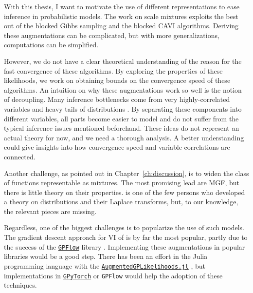 

\graphicspath{{9_conclusion/figures/}}
With this thesis, I want to motivate the use of different representations to ease inference in probabilistic models.
The work on scale mixtures exploits the best out of the blocked Gibbs sampling and the blocked \ac{CAVI} algorithms.
Deriving these augmentations can be complicated, but with more generalizations, computations can be simplified.

However, we do not have a clear theoretical understanding of the reason for the fast convergence of these algorithms.
By exploring the properties of these likelihoods, we work on obtaining bounds on the convergence speed of these algorithms.
An intuition on why these augmentations work so well is the notion of decoupling.
Many inference bottlenecks come from very highly-correlated variables and heavy tails of distributions \cite{betancourt2017conceptual}.
By separating these components into different variables, all parts become easier to model and do not suffer from the typical inference issues mentioned beforehand.
These ideas do not represent an actual theory for now, and we need a thorough analysis.
A better understanding could give insights into how convergence speed and variable correlations are connected.

Another challenge, as pointed out in Chapter~\ref{ch:discussion}, is to widen the class of functions representable as mixtures.
The most promising lead are \acf{MGF}, but there is little theory on their properties.
\citet{schwartz1952transformation} is one of the few persons who developed a theory on distributions and their Laplace transforms, but, to our knowledge, the relevant pieces are missing.

Regardless, one of the biggest challenges is to popularize the use of such models.
The gradient descent approach for \ac{VI} of \citet{Hensman2015} is by far the most popular, partly due to the success of the \href{https://github.com/GPflow/GPflow}{\texttt{GPFlow}} library \cite{GPflow2017}.
Implementing these augmentations in popular libraries would be a good step.
There has been an effort in the Julia programming language \cite{Julia-2017} with the \href{https://github.com/JuliaGaussianProcesses/AugmentedGPLikelihoods.jl}{\texttt{AugmentedGPLikelihoods.jl}} \cite{theo_galy_fajou_2022_6347022}, but implementations in \href{https://gpytorch.ai/}{\texttt{GPyTorch}} \cite{gardner2018gpytorch} or \texttt{GPFlow} would help the adoption of these techniques.

